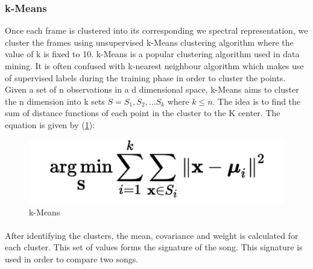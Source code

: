 \documentclass[12pt]{article}
\begin{document}
\subsubsection{k-Means}
Once each frame is clustered into its corresponding we spectral representation, we cluster the frames using unsupervised k-Means clustering algorithm where the value of k is  fixed to 10. k-Means is a popular clustering algorithm used in data mining. It is often confused with k-nearest neighbour algorithm which makes use of supervised labels during the training phase in order to cluster the points. Given a set of n observations in a d dimensional space, k-Means aims to cluster the n dimension into k sets $S = {S_1,S_2,...S_k}$ where $ k \leq n$. The idea is to find the sum of distance functions of each point in the cluster to the K center. The equation is given by (\ref{kmeans}):

\begin{figure}[h]\label{kmeans}
\center
\includegraphics{fig2.png}
\caption{k-Means}
\end{figure}

\paragraph{}
After identifying the clusters, the mean, covariance and weight is calculated for each cluster. This set of values forms the signature of the song. This signature is used in order to compare two songs.
\end{document}
